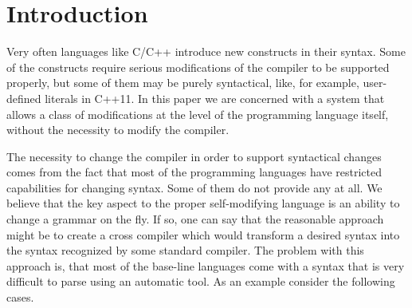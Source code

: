 \section{\label{sec:intro}Introduction}

Very often languages like C/C++ introduce new constructs in their
syntax.  Some of the constructs require serious modifications of the
compiler to be supported properly, but some of them may be purely syntactical,
like, for example, user-defined literals in C++11.  In this paper we are
concerned with a system that allows a class of modifications at the 
level of the programming language itself, without the necessity to
modify the compiler.

The necessity to change the compiler in order to support syntactical 
changes comes from the fact that most of the programming languages 
have restricted capabilities for changing syntax.  Some of them do not
provide any at all.  We believe that the key
aspect to the proper self-modifying language is an ability to 
change a grammar on the fly.  If so, one can say that the
reasonable approach might be to create a cross compiler which
would transform a desired syntax into the syntax recognized by
some standard compiler.  The problem with this approach is, that most of
the base-line languages come with a syntax that is very difficult
to parse using an automatic tool.  As an example consider the 
following cases.



